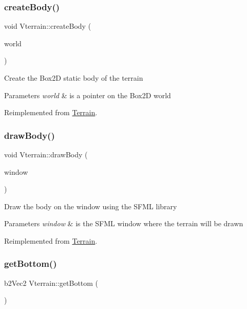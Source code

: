 \subsubsection{\texorpdfstring{create\+Body()}{createBody()}}
{\footnotesize\ttfamily void Vterrain\+::create\+Body (\begin{DoxyParamCaption}\item[{b2\+World $\ast$}]{world }\end{DoxyParamCaption})\hspace{0.3cm}{\ttfamily [virtual]}}

Create the Box2D static body of the terrain 
\begin{DoxyParams}{Parameters}
{\em world} & is a pointer on the Box2D world \\
\hline
\end{DoxyParams}


Reimplemented from \mbox{\hyperlink{class_terrain_a97e007277f8abb9dde20ef2b49c38a3a}{Terrain}}.

\mbox{\label{class_vterrain_a4be34646206e14fe5f5aa3d39761e3fe}} 
\subsubsection{\texorpdfstring{draw\+Body()}{drawBody()}}
{\footnotesize\ttfamily void Vterrain\+::draw\+Body (\begin{DoxyParamCaption}\item[{sf\+::\+Render\+Window \&}]{window }\end{DoxyParamCaption})\hspace{0.3cm}{\ttfamily [virtual]}}

Draw the body on the window using the S\+F\+ML library 
\begin{DoxyParams}{Parameters}
{\em window} & is the S\+F\+ML window where the terrain will be drawn \\
\hline
\end{DoxyParams}


Reimplemented from \mbox{\hyperlink{class_terrain_ae60571b91c1979fa94bdfc5002da6ac7}{Terrain}}.

\mbox{\label{class_vterrain_a970e49a3753e1c4bc4424b2602c25f85}} 
\subsubsection{\texorpdfstring{get\+Bottom()}{getBottom()}}
{\footnotesize\ttfamily b2\+Vec2 Vterrain\+::get\+Bottom (\begin{DoxyParamCaption}{ }\end{DoxyParamCaption})\hspace{0.3cm}{\ttfamily [virtual]}}


